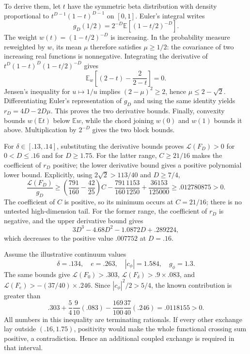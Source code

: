 To derive them, let $t$ have the symmetric beta distribution with
density proportional to $t^{D-1}(1-t)^{D-1}$ on $[0,1]$. Euler's
integral writes
\[
 g_D(1/2)=2^{-D}\mathbb E[(1-t/2)^{-D}].
\]
The weight $w(t)=(1-t/2)^{-D}$ is increasing. In the probability
measure reweighted by $w$, its mean $\mu$ therefore satisfies
$\mu\geq1/2$: the covariance of two increasing real functions is
nonnegative. Integrating the derivative of
$t^D(1-t)^D(1-t/2)^{-D}$ gives
\[
 \mathbb E_w\!\left[(2-t)-\frac2{2-t}\right]=0.
\]
Jensen's inequality for $u\mapsto1/u$ implies
$(2-\mu)^2\geq2$, hence $\mu\leq2-\sqrt2$.
Differentiating Euler's representation of $g_D$ and using the same
identity yields $r_D=4D-2D\mu$. This proves the two derivative
bounds. Finally, convexity bounds $w(\mathbb E t)$ below
$\mathbb E w$, while the chord joining $w(0)$ and $w(1)$ bounds it
above. Multiplication by $2^{-D}$ gives the two block bounds.

For $\delta\in[.13,.14]$, substituting the derivative bounds proves
$\mathcal L(F_D)>0$ for $0<D\leq.16$ and for $D\geq1.75$.
For the latter range, $C\geq21/16$ makes the coefficient of $r_D$
positive; the lower derivative bound gives a positive polynomial
lower bound. Explicitly, using $2\sqrt2>113/40$ and $D\geq7/4$,
\[
 \frac{\mathcal L(F_D)}{g_D}
 \geq\left(\frac{791}{160}-\frac{42}{25}\right)C
 -\frac{791}{160}\frac{1153}{1250}
 +\frac{36153}{125000}
 \geq .012780875>0.
\]
The coefficient of $C$ is positive, so its minimum occurs at
$C=21/16$; there is no untested high-dimension tail. For the
former range, the coefficient of $r_D$ is negative, and the
upper derivative bound gives
\[
 3D^3-4.68D^2-1.0872D+.289224,
\]
which decreases to the positive value $.007752$ at $D=.16$.

\begin{example}
Assume the illustrative continuum values
\[
 \delta=.134,\quad e=.263,\quad |c_\phi|=1.584,
 \quad g_\phi=1.3.
\]
The same bounds give
$\mathcal L(F_0)>.303$,
$\mathcal L(F_\delta)>.9\times.083$,
and $\mathcal L(F_e)>-(37/40)\times.246$.
Since $|c_\phi|^2/2>5/4$, the known contribution is greater than
\[
 .303+\frac54\frac9{10}(.083)
       -\frac{169}{100}\frac{37}{40}(.246)
 =.0118155>0.
\]
All numbers in this inequality are terminating rationals. If every
other exchange lay outside $(.16,1.75)$, positivity would make the
whole functional crossing sum positive, a contradiction. Hence an
additional coupled exchange is required in that interval.
\end{example}

